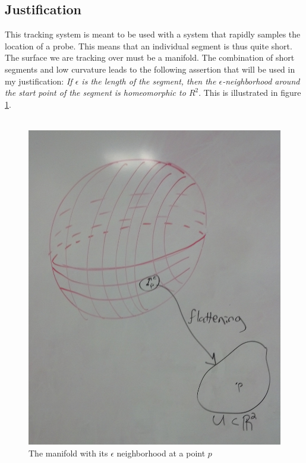 \subsection{Justification}

This tracking system is meant to be used with a system that rapidly samples the location of a probe. This means that an individual segment is thus quite short. The surface we are tracking over must be a manifold. The combination of short segments and low curvature leads to the following assertion that will be used in my justification: {\it If $\epsilon$ is the length of the segment, then the $\epsilon$-neighborhood around the start point of the segment is homeomorphic to $R^2$}. This is illustrated in figure \ref{manifolddiagram}.\\
\\
\begin{figure}[ht]
\centering
\includegraphics[width=\columnwidth]{manifolddiagram.jpg}
\caption{The manifold with its $\epsilon$ neighborhood at a point $p$}
\label{manifolddiagram}
\end{figure}
